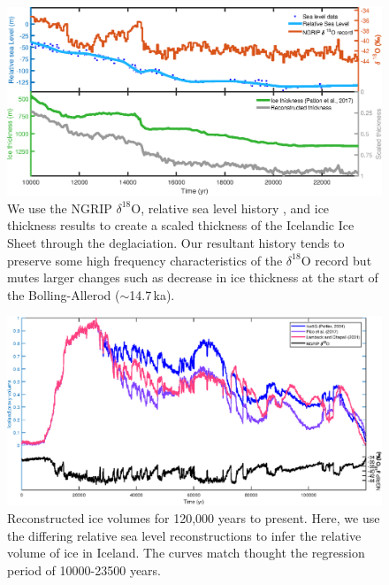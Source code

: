 \documentclass[draft,grl]{agutexSI2018}
\begin{document}
\begin{figure}
\includegraphics{../figures/version05/supp-figure1.eps}
\caption{We use the NGRIP $\delta^{18}$O, relative sea level history \citep{spratt-2016}, and ice thickness results \citep{lambeck-etal-2014} to create a scaled thickness of the Icelandic Ice Sheet through the deglaciation. Our resultant history tends to preserve some high frequency characteristics of the $\delta^{18}$O record but mutes larger changes such as decrease in ice thickness at the start of the B{\/o}lling-Aller{\/o}d ($\sim$14.7\,ka).}
\label{fg:S1}
\end{figure}

\begin{figure}
\includegraphics{../figures/version05/supp-figure2.eps}
\caption{Reconstructed ice volumes for 120,000 years to present. Here, we use the differing relative sea level reconstructions \citep{peltier-2004,pico-etal-2017,lambeck-2001} to infer the relative volume of ice in Iceland. The curves match thought the regression period of 10000-23500 years.}
\label{fg:S2}
\end{figure}
\end{document}
